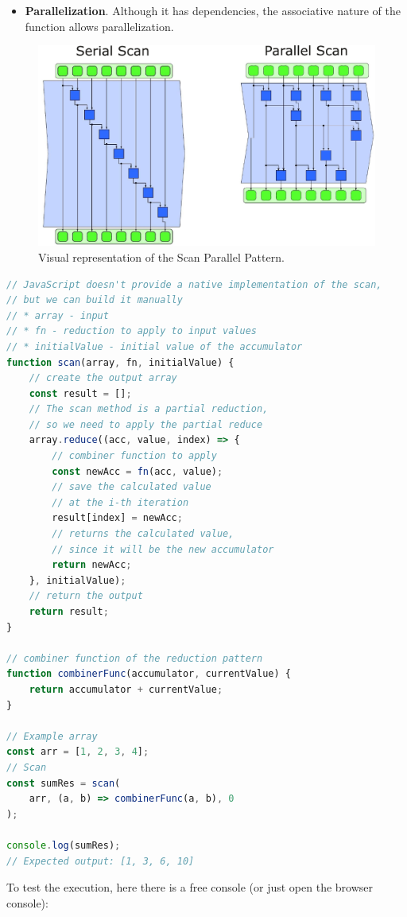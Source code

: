 \begin{enumerate}
\begin{itemize}
        \item[\textcolor{Green3}{\faIcon{question-circle}}] \textcolor{Green3}{\textbf{Parallelization}}. Although it has dependencies, the associative nature of the function allows parallelization.
    \end{itemize}
    \begin{figure}[!htp]
        \centering
        \includegraphics[width=.84\textwidth]{img/scan-pattern-1.pdf}
        \caption{Visual representation of the Scan Parallel Pattern.}
    \end{figure}
    \begin{examplebox}
        \begin{lstlisting}[language=JavaScript]
// JavaScript doesn't provide a native implementation of the scan,
// but we can build it manually
// * array - input
// * fn - reduction to apply to input values
// * initialValue - initial value of the accumulator
function scan(array, fn, initialValue) {
    // create the output array
    const result = [];
    // The scan method is a partial reduction,
    // so we need to apply the partial reduce
    array.reduce((acc, value, index) => {
        // combiner function to apply
        const newAcc = fn(acc, value);
        // save the calculated value
        // at the i-th iteration
        result[index] = newAcc;
        // returns the calculated value,
        // since it will be the new accumulator
        return newAcc;
    }, initialValue);
    // return the output
    return result;
}

// combiner function of the reduction pattern
function combinerFunc(accumulator, currentValue) {
    return accumulator + currentValue;
}

// Example array
const arr = [1, 2, 3, 4];
// Scan
const sumRes = scan(
    arr, (a, b) => combinerFunc(a, b), 0
);

console.log(sumRes);
// Expected output: [1, 3, 6, 10]\end{lstlisting}
        To test the execution, here there is a free console (or just open the browser console):
        \begin{center}
        \end{center}
    \end{examplebox}



\end{enumerate}

